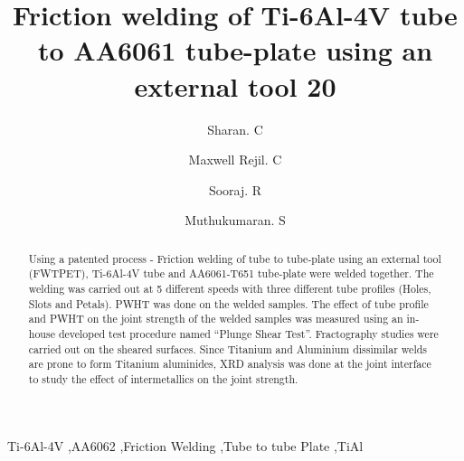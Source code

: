 \documentclass[preprint]{elsarticle}
\begin{document}
\newcommand{\degree}[1]{\ensuremath{^{\circ}}}  %



\begin{frontmatter}

\title{Friction welding of Ti-6Al-4V tube to AA6061 tube-plate using an external tool 20\degree}

\author[META]{Sharan. C}
\author[META]{Maxwell Rejil. C}
\author[META]{Sooraj. R}
\author[META]{Muthukumaran. S}


\address[META]{Department of Metallurgical and Materials Engineering, National Institute of Technology, Tiruchirappalli-620015, India}
         
\begin{abstract}
Using a patented process - Friction welding of tube to tube-plate using an external tool (FWTPET), Ti-6Al-4V tube and AA6061-T651 tube-plate were welded together. The welding was carried out at 5 different speeds with three different tube profiles (Holes, Slots and Petals). PWHT was done on the welded samples. The effect of tube profile and PWHT on the joint strength of the welded samples was measured using an in-house developed test procedure named ``Plunge Shear Test''. Fractography studies were carried out on the  sheared surfaces. Since Titanium and Aluminium dissimilar welds are prone to form Titanium aluminides, XRD analysis was done at the joint interface to study the effect of intermetallics on the joint strength.
\end{abstract}

\begin{keyword}
Ti-6Al-4V \sep AA6062 \sep Friction Welding \sep Tube to tube Plate \sep TiAl
\end{keyword}

\end{frontmatter}

\end{document}

